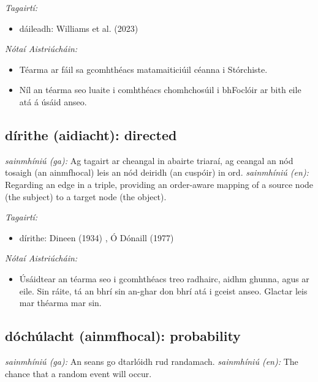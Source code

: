 \documentclass{article}
\begin{document}
 \noindent \textit{Tagairtí:}
\begin{itemize}
	\item dáileadh: Williams et al. (2023) \cite{storchiste}
\end{itemize}

 \noindent \textit{Nótaí Aistriúcháin:}
\begin{itemize}
	\item Téarma ar fáil sa gcomhthéacs matamaiticiúil céanna i Stórchiste.
	\item Níl an téarma seo luaite i comhthéacs chomhchosúil i bhFoclóir ar bith eile atá á úsáid anseo.
\end{itemize}


\subsection*{dírithe (aidiacht): directed} 
 \noindent \textit{sainmhíniú (ga):} Ag tagairt ar cheangal in abairte triaraí, ag ceangal an nód tosaigh (an ainmfhocal) leis an nód deiridh (an cuspóir) in ord.
\newline\newline
 \noindent \textit{sainmhíniú (en):} Regarding an edge in a triple, providing an order-aware mapping of a source node (the subject) to a target node (the object).
\newline

 \noindent \textit{Tagairtí:}
\begin{itemize}
	\item dírithe: Dineen (1934) \cite{dineen}, Ó Dónaill (1977) \cite{odonaill}
\end{itemize}

 \noindent \textit{Nótaí Aistriúcháin:}
\begin{itemize}
	\item Úsáidtear an téarma seo i gcomhthéacs treo radhairc, aidhm ghunna, agus ar eile. Sin ráite, tá an bhrí sin an-ghar don bhrí atá i gceist anseo. Glactar leis mar théarma mar sin.
\end{itemize}


\subsection*{dóchúlacht (ainmfhocal): probability} 
 \noindent \textit{sainmhíniú (ga):} An seans go dtarlóidh rud randamach.
\newline\newline
 \noindent \textit{sainmhíniú (en):} The chance that a random event will occur.
\newline
\end{document}
